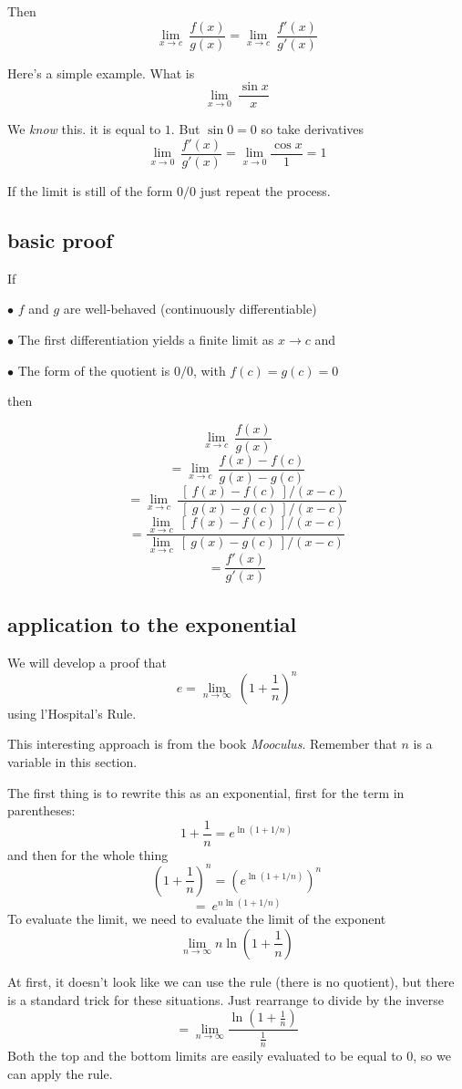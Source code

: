 \documentclass[11pt, oneside]{article}
\begin{document}
Then
\[ \lim_{x \rightarrow c} \ \frac{f(x)}{g(x)} = \lim_{x \rightarrow c} \ \frac{f'(x)}{g'(x)} \]

Here's a simple example.  What is
\[ \lim_{x \rightarrow 0} \ \frac{\sin x}{x} \]

We \emph{know} this.  it is equal to $1$.  But $\sin 0 = 0$ so take derivatives
\[ \lim_{x \rightarrow 0} \ \frac{f'(x)}{g'(x)} = \lim_{x \rightarrow 0} \frac{\cos x}{1} = 1  \]

If the limit is still of the form $0/0$ just repeat the process.

\subsection*{basic proof}
If 

$\bullet$  $f$ and $g$ are well-behaved (continuously differentiable)

$\bullet$  The first differentiation yields a finite limit as $x \rightarrow c$ and

$\bullet$  The form of the quotient is $0/0$, with $f(c) = g(c) = 0$

then

\[ \lim_{x \rightarrow c} \ \frac{f(x)}{g(x)} \]
\[ = \lim_{x \rightarrow c} \ \frac{f(x) - f(c)}{g(x) - g(c)}  \]
\[ = \lim_{x \rightarrow c} \ \frac{\ [ \ f(x) - f(c) \ ] /(x-c)}{\ [ \ g(x) - g(c) \ ] / (x-c)}  \]
\[ = \frac{\lim_{x \rightarrow c} \ [ \ f(x) - f(c) \ ] /(x-c)}{\lim_{x \rightarrow c} \ [ \ g(x) - g(c) \ ] / (x-c)}  \]
\[ = \frac{f'(x)}{g'(x)} \]

\subsection*{application to the exponential}

We will develop a proof that
\[ e = \lim_{n \rightarrow \infty} \ (1 + \frac{1}{n})^n \]
using l'Hospital's Rule.

This interesting approach is from the book \emph{Mooculus}.  Remember that $n$ is a variable in this section.

The first thing is to rewrite this as an exponential, first for the term in parentheses:
\[ 1 + \frac{1}{n} = e^{\ln(1 + 1/n)} \]
and then for the whole thing
\[ (1 + \frac{1}{n})^n =  (e^{\ln(1 + 1/n)})^n \]
\[ = \ e^{n \ln(1 + 1/n)} \]
To evaluate the limit, we need to evaluate the limit of the exponent
\[ \lim_{n \rightarrow \infty} n   \ln (1 + \frac{1}{n})  \]

At first, it doesn't look like we can use the rule (there is no quotient), but there is a standard trick for these situations.  Just rearrange to divide by the inverse
\[ = \lim_{n \rightarrow \infty} \frac{ \ln (1 + \frac{1}{n})}{\frac{1}{n}}  \]
Both the top and the bottom limits are easily evaluated to be equal to $0$, so we can apply the rule.
\end{document}
